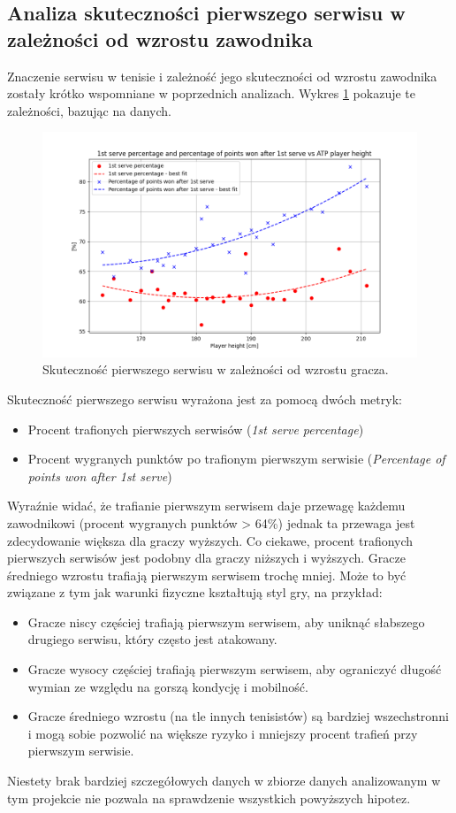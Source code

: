 \documentclass[12pt, a4paper]{article}
\begin{document}
\subsection{Analiza skuteczności pierwszego serwisu w zależności od wzrostu zawodnika}
Znaczenie serwisu w tenisie i zależność jego skuteczności od wzrostu zawodnika zostały krótko wspomniane w poprzednich analizach. Wykres \ref{fig:serve_height} pokazuje te zależności, bazując na danych.
\begin{figure}[h]
    \includegraphics[width=\textwidth]{figures/serve_height.png}
    \caption{Skuteczność pierwszego serwisu w zależności od wzrostu gracza.}
    \label{fig:serve_height}
\end{figure}
Skuteczność pierwszego serwisu wyrażona jest za pomocą dwóch metryk:
\begin{itemize}
    \item Procent trafionych pierwszych serwisów (\textit{1st serve percentage})
    \item Procent wygranych punktów po trafionym pierwszym serwisie (\textit{Percentage of points won after 1st serve})
\end{itemize}
Wyraźnie widać, że trafianie pierwszym serwisem daje przewagę każdemu zawodnikowi (procent wygranych punktów > 64\%) jednak ta przewaga jest zdecydowanie większa dla graczy wyższych. Co ciekawe, procent trafionych pierwszych serwisów jest podobny dla graczy niższych i wyższych. Gracze średniego wzrostu trafiają pierwszym serwisem trochę mniej. Może to być związane z tym jak warunki fizyczne kształtują styl gry, na przykład:
\begin{itemize}
    \item Gracze niscy częściej trafiają pierwszym serwisem, aby uniknąć słabszego drugiego serwisu, który często jest atakowany.
    \item Gracze wysocy częściej trafiają pierwszym serwisem, aby ograniczyć długość wymian ze względu na gorszą kondycję i mobilność.
    \item Gracze średniego wzrostu (na tle innych tenisistów) są bardziej wszechstronni i mogą sobie pozwolić na większe ryzyko i mniejszy procent trafień przy pierwszym serwisie.
\end{itemize}
Niestety brak bardziej szczegółowych danych w zbiorze danych analizowanym w tym projekcie nie pozwala na sprawdzenie wszystkich powyższych hipotez.
\end{document}
